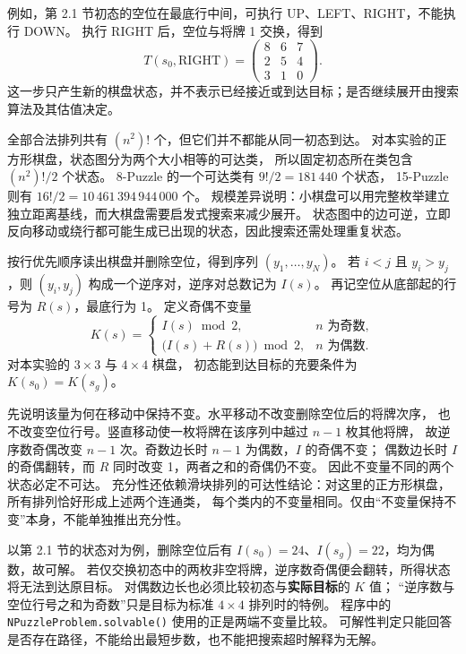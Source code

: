 例如，第 2.1 节初态的空位在最底行中间，可执行 UP、LEFT、RIGHT，不能执行 DOWN。
执行 RIGHT 后，空位与将牌 1 交换，得到
\[
T(s_0,\mathrm{RIGHT})=
\left(\begin{array}{ccc}8&6&7\\2&5&4\\3&1&0\end{array}\right).
\]
这一步只产生新的棋盘状态，并不表示已经接近或到达目标；是否继续展开由搜索算法及其估值决定。

全部合法排列共有 $(n^2)!$ 个，但它们并不都能从同一初态到达。
对本实验的正方形棋盘，状态图分为两个大小相等的可达类，
所以固定初态所在类包含 $(n^2)!/2$ 个状态。
8-Puzzle 的一个可达类有 $9!/2=181\,440$ 个状态，
15-Puzzle 则有 $16!/2=10\,461\,394\,944\,000$ 个。
规模差异说明：小棋盘可以用完整枚举建立独立距离基线，而大棋盘需要启发式搜索来减少展开。
状态图中的边可逆，立即反向移动或绕行都可能生成已出现的状态，因此搜索还需处理重复状态。

\par\vspace{2bp}

按行优先顺序读出棋盘并删除空位，得到序列 $(y_1,\ldots,y_N)$。
若 $i<j$ 且 $y_i>y_j$，则 $(y_i,y_j)$ 构成一个逆序对，逆序对总数记为 $I(s)$。
再记空位从底部起的行号为 $R(s)$，最底行为 1。
定义奇偶不变量
\[
K(s)=\left\{\begin{array}{ll}
I(s)\bmod 2, & n\mbox{ 为奇数},\\
\bigl(I(s)+R(s)\bigr)\bmod 2, & n\mbox{ 为偶数}.
\end{array}\right.
\]
对本实验的 $3\times3$ 与 $4\times4$ 棋盘，
初态能到达目标的充要条件为 $K(s_0)=K(s_g)$。

先说明该量为何在移动中保持不变。水平移动不改变删除空位后的将牌次序，
也不改变空位行号。竖直移动使一枚将牌在该序列中越过 $n-1$ 枚其他将牌，
故逆序数奇偶改变 $n-1$ 次。奇数边长时 $n-1$ 为偶数，$I$ 的奇偶不变；
偶数边长时 $I$ 的奇偶翻转，而 $R$ 同时改变 1，两者之和的奇偶仍不变。
因此不变量不同的两个状态必定不可达。
充分性还依赖滑块排列的可达性结论：对这里的正方形棋盘，所有排列恰好形成上述两个连通类，
每个类内的不变量相同。仅由“不变量保持不变”本身，不能单独推出充分性。

以第 2.1 节的状态对为例，删除空位后有 $I(s_0)=24$、$I(s_g)=22$，均为偶数，故可解。
若仅交换初态中的两枚非空将牌，逆序数奇偶便会翻转，所得状态将无法到达原目标。
对偶数边长也必须比较初态与\textbf{实际目标}的 $K$ 值；
“逆序数与空位行号之和为奇数”只是目标为标准 $4\times4$ 排列时的特例。
程序中的 \texttt{NPuzzleProblem.solvable()} 使用的正是两端不变量比较。
可解性判定只能回答是否存在路径，不能给出最短步数，也不能把搜索超时解释为无解。

